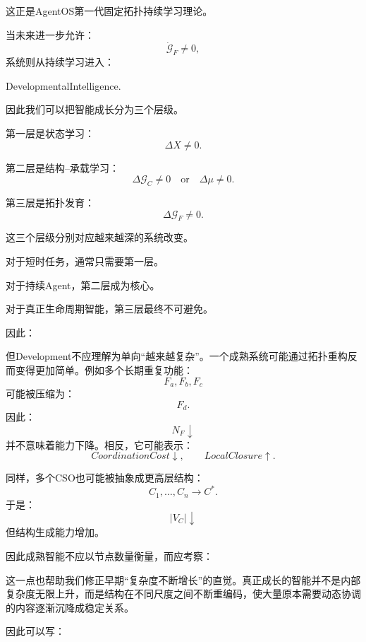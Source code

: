这正是AgentOS第一代固定拓扑持续学习理论。

当未来进一步允许：
\[
\dot{\mathcal G}_F\neq0,
\]
系统则从持续学习进入：
\begin{statementbox}
DevelopmentalIntelligence.
\end{statementbox}

因此我们可以把智能成长分为三个层级。

第一层是状态学习：
\[
\Delta X\neq0.
\]

第二层是结构--承载学习：
\[
\Delta\mathcal G_C\neq0
\quad\text{or}\quad
\Delta\mu\neq0.
\]

第三层是拓扑发育：
\[
\Delta\mathcal G_F\neq0.
\]

这三个层级分别对应越来越深的系统改变。

对于短时任务，通常只需要第一层。

对于持续Agent，第二层成为核心。

对于真正生命周期智能，第三层最终不可避免。

因此：
\begin{statementbox}
\centering
{}
\end{statementbox}

但Development不应理解为单向“越来越复杂”。一个成熟系统可能通过拓扑重构反而变得更加简单。例如多个长期重复功能：
\[
F_a,F_b,F_c
\]
可能被压缩为：
\[
F_d.
\]
因此：
\[
N_F\downarrow
\]
并不意味着能力下降。相反，它可能表示：
\[
CoordinationCost\downarrow,
\qquad
LocalClosure\uparrow.
\]

同样，多个CSO也可能被抽象成更高层结构：
\[
C_1,\ldots,C_n
\rightarrow
C^\ast.
\]
于是：
\[
|V_C|\downarrow
\]
但结构生成能力增加。

因此成熟智能不应以节点数量衡量，而应考察：
\begin{statementbox}
\centering
{}
\end{statementbox}

这一点也帮助我们修正早期“复杂度不断增长”的直觉。真正成长的智能并不是内部复杂度无限上升，而是结构在不同尺度之间不断重编码，使大量原本需要动态协调的内容逐渐沉降成稳定关系。

因此可以写：
\begin{statementbox}
\centering
{}
\end{statementbox}

